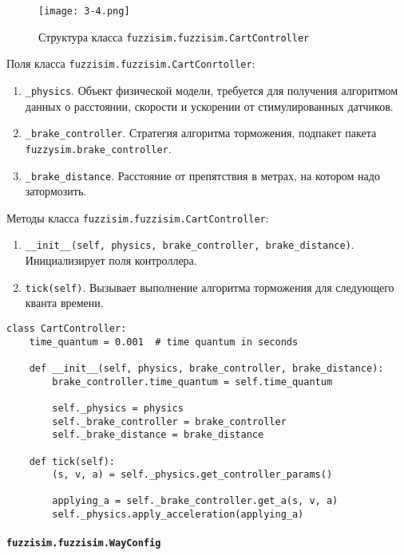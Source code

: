 \begin{figure}[ht]
	\centering
	\texttt{[image: 3-4.png]}
	\caption{ Структура класса \lstinline!fuzzisim.fuzzisim.CartController! }
\end{figure}

Поля класса \lstinline!fuzzisim.fuzzisim.CartConrtoller!:
\begin{enumerate}[label=\arabic*)]
	\item  \lstinline!_physics!. Объект физической модели, требуется для получения алгоритмом данных о расстоянии, скорости и ускорении от стимулированных датчиков.
	\item  \lstinline!_brake_controller!. Стратегия алгоритма торможения, подпакет пакета \lstinline!fuzzysim.brake_controller!.
	\item  \lstinline!_brake_distance!. Расстояние от препятствия в метрах, на котором надо затормозить.
\end{enumerate}
Методы класса \lstinline!fuzzisim.fuzzisim.CartController!:
\begin{enumerate}[label=\arabic*)]
	\item  \lstinline!__init__(self, physics, brake_controller, brake_distance)!. Инициализирует поля контроллера.
	\item  \lstinline!tick(self)!.  Вызывает выполнение алгоритма торможения для следующего кванта времени.
\end{enumerate}


\begin{lstlisting}[style=pythonstyle,caption={  }, label=lst:func:1]
class CartController:
	time_quantum = 0.001  # time quantum in seconds

	def __init__(self, physics, brake_controller, brake_distance):
		brake_controller.time_quantum = self.time_quantum

		self._physics = physics
		self._brake_controller = brake_controller
		self._brake_distance = brake_distance

	def tick(self):
		(s, v, a) = self._physics.get_controller_params()

		applying_a = self._brake_controller.get_a(s, v, a)
		self._physics.apply_acceleration(applying_a)
\end{lstlisting}


\paragraph{\lstinline!fuzzisim.fuzzisim.WayConfig!}

